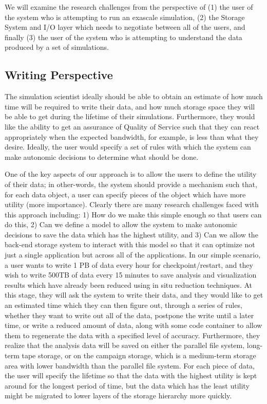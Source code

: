 We will examine the research challenges from the perspective of
%
(1) the user of the system who is attempting to run an exascale simulation,
%
(2) the Storage System and I/O layer which needs to negotiate between all of
the users, and finally
%
(3) the user of the system who is attempting to understand the data
produced by a set of simulations.

\subsection{Writing Perspective}
\label{subsec:sim-perspective}
The simulation scientist ideally should be able to
obtain an estimate of how much time will be required to write their data,
and how much storage space they will be able to get during the lifetime of
their simulations. Furthermore, they would like the ability to get an assurance
of Quality of Service such that they can react appropriately when the
expected bandwidth, for example, is less than what they desire. Ideally, the user
would specify a set of rules with which the system can make autonomic
decisions to determine what should be done.
%

One of the key aspects of our approach is to allow the users to define the
utility of their data; in other-words, the system should provide a
mechanism such that, for each data object, a user can specify pieces of the object
which have more utility (more importance).
Clearly there are many research challenges faced with
this approach including: 1) How do we make this simple enough so that users can
do this, 2) Can we define a model to allow the system to make
autonomic decisions to save the data which has the highest utility, and 3) Can
we allow the back-end storage system to interact with this model so that
it can optimize not just a single application but across all of the
applications.
  In our simple scenario, a user wants to write 1 PB of data every hour
for checkpoint/restart, and they wish to write 500TB of data every 15
minutes to save analysis and visualization results which have already been reduced
using in situ reduction techniques. At this stage, they will ask the system to
write their data, and they would like to get an estimated time which they can
then figure out, through a series of rules, whether they want to write out all
of the data, postpone the write until a later time, or write a reduced amount
of data, along with some code
container to allow them to regenerate the data with a specified level of
accuracy.  Furthermore, they realize that the analysis data will be saved on
either the parallel file system, long-term tape storage, or on the campaign storage,
which is a medium-term storage
area with lower bandwidth than the parallel file system.
For each piece of data, the user will specify the lifetime so
that the data with the highest utility is kept around for the longest
period of time, but the data which has the least utility might be migrated to
lower layers of the storage hierarchy more quickly. 

